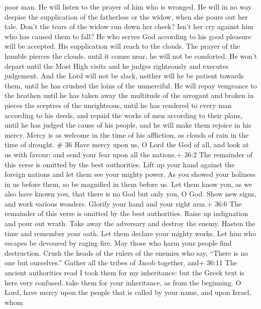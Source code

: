poor man. He will listen to the prayer of him who is wronged.
 He will in no way despise the supplication of the
fatherless or the widow, when she pours out her tale. 
Don't the tears of the widow run down her cheek? Isn't her cry against
him who has caused them to fall?  He who serves God
according to his good pleasure will be accepted. His supplication will
reach to the clouds.  The prayer of the humble pierces the
clouds. until it comes near, he will not be comforted. He won't depart
until the Most High visits and he judges righteously and executes
judgement.  And the Lord will not be slack, neither will he
be patient towards them, until he has crushed the loins of the
unmerciful. He will repay vengeance to the heathen until he has taken
away the multitude of the arrogant and broken in pieces the sceptres of
the unrighteous,  until he has rendered to every man
according to his deeds, and repaid the works of men according to their
plans, until he has judged the cause of his people, and he will make
them rejoice in his mercy.  Mercy is as welcome in the time
of his affliction, as clouds of rain in the time of drought. \# 36
 Have mercy upon us, O Lord the God of all, and look at us
with favour;  and send your fear upon all the nations.+ 36:2
The remainder of this verse is omitted by the best authorities.
 Lift up your hand against the foreign nations and let them
see your mighty power.  As you showed your holiness in us
before them, so be magnified in them before us.  Let them
know you, as we also have known you, that there is no God but only you,
O God.  Show new signs, and work various wonders. Glorify
your hand and your right arm.+ 36:6 The remainder of this verse is
omitted by the best authorities.  Raise up indignation and
pour out wrath. Take away the adversary and destroy the enemy.
 Hasten the time and remember your oath. Let them declare
your mighty works.  Let him who escapes be devoured by
raging fire. May those who harm your people find destruction.
 Crush the heads of the rulers of the enemies who say,
``There is no one but ourselves.''  Gather all the tribes
of Jacob together, and+ 36:11 The ancient authorities read I took them
for my inheritance: but the Greek text is here very confused. take them
for your inheritance, as from the beginning.  O Lord, have
mercy upon the people that is called by your name, and upon Israel, whom
